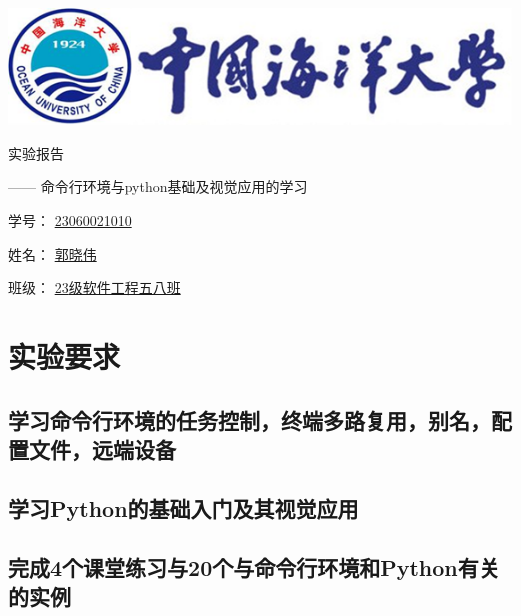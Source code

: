 \documentclass[UTF8,a4paper]{ctexart}
\begin{document}
\begin{sloppypar}


	\begin{center}
	\includegraphics[width = 14cm]{picture/s1}

		\begin{fontsize}{60pt}{20pt}
			实验报告
		\end{fontsize}

		\bigskip
		\bigskip
		
		\begin{fontsize}{20pt}{20pt}
			\begin{flushright}
				—— 命令行环境与{\Huge python}基础及视觉应用的学习
			\end{flushright}
		\end{fontsize}
		
		\bigskip
		\bigskip
		\bigskip
		\bigskip
		\bigskip
		\bigskip
		\bigskip
		\bigskip
		\bigskip
		\bigskip
		\bigskip
		\bigskip
		\bigskip
		\bigskip
		\bigskip
		\bigskip
		
		\begin{fontsize}{25pt}{20pt}

			学号：
			\underline{{\huge 23060021010}}
			\bigskip
			\bigskip
			\bigskip
			\bigskip

			姓名：
			\underline{郭晓伟}
			\bigskip
			\bigskip
			\bigskip
			\bigskip

			班级：
			\underline{{\Huge 23}级软件工程五八班}
				
		\end{fontsize}
	\end{center}
	\section{实验要求}
	\subsection{学习命令行环境的任务控制，终端多路复用，别名，配置文件，远端设备}
	\subsection{学习Python的基础入门及其视觉应用}
	\subsection{完成4个课堂练习与20个与命令行环境和Python有关的实例}


\end{sloppypar}
\end{document}
